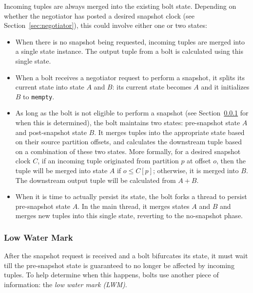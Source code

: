 \documentclass[10pt,nocopyrightspace]{sigplanconf}
\begin{document}
Incoming tuples are always merged into the existing bolt state. Depending on
whether the negotiator has posted a desired snapshot clock (see
Section~\ref{sec:negotiator}), this could involve either one or two states:

\begin{itemize}

  \item When there is no snapshot being requested, incoming tuples are merged
  into a single state instance. The output tuple from a bolt is calculated
  using this single state.

  \item When a bolt receives a negotiator request to perform a snapshot, it
  splits its current state into state $A$ and $B$: its current state becomes
  $A$ and it initializes $B$ to \lstinline{mempty}.

  \item As long as the bolt is not eligible to perform a snapshot (see
  Section~\ref{sec:lwm} for when this is determined), the bolt maintains two
  states: pre-snapshot state $A$ and post-snapshot state $B$. It merges tuples
  into the appropriate state based on their source partition offsets, and
  calculates the downstream tuple based on a combination of these two states.
  More formally, for a desired snapshot clock $C$, if an incoming tuple
  originated from partition $p$ at offset $o$, then the tuple will be merged
  into state $A$ if $o \leq C[p]$; otherwise, it is merged into $B$. The
  downstream output tuple will be calculated from $A + B$.

  \item When it is time to actually persist its state, the bolt forks a thread
  to persist pre-snapshot state $A$. In the main thread, it merges states $A$
  and $B$ and merges new tuples into this single state, reverting to the
  no-snapshot phase.

\end{itemize}

\subsubsection{Low Water Mark}
\label{sec:lwm}

After the snapshot request is received and a bolt bifurcates its state, it must
wait till the pre-snapshot state is guaranteed to no longer be affected by
incoming tuples. To help determine when this happens, bolts use another piece
of information: the \textit{low water mark (LWM)}.
\end{document}
